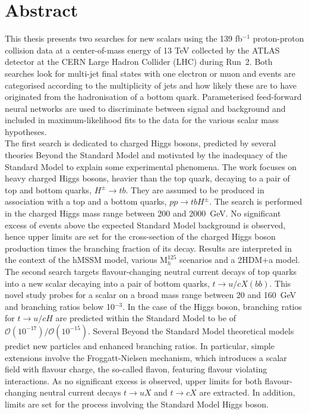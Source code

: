 \chapter*{Abstract}

This thesis presents two searches for new scalars using the 139 fb$^{-1}$ proton-proton collision data at a center-of-mass energy of 13 TeV collected by the ATLAS detector at the CERN Large Hadron Collider (LHC) during Run~2. Both searches look for multi-jet final states with one electron or muon and events are categorised according to the multiplicity of jets and how likely these are to have originated from the hadronisation of a bottom quark. Parameterised feed-forward neural networks are used to discriminate between signal and background and included in maximum-likelihood fits to the data for the various scalar mass hypotheses.\\

The first search is dedicated to charged Higgs bosons, predicted by several theories Beyond the Standard Model and motivated by the inadequacy of the Standard Model to explain some experimental phenomena. The work focuses on heavy charged Higgs bosons, heavier than the top quark, decaying to a pair of top and bottom quarks, $H^\pm\to tb$. They are assumed to be produced in association with a top and a bottom quarks, $pp\to tbH^\pm$. The search is performed in the charged Higgs mass range between 200 and 2000~GeV. No significant excess of events above the expected Standard Model background is observed, hence upper limits are set for the cross-section of the charged Higgs boson production times the branching fraction of its decay. Results are interpreted in the context of the hMSSM model, various $\text{M}_h^{125}$ scenarios and a 2HDM+a model.\\

The second search targets flavour-changing neutral current decays of top quarks into a new scalar decaying into a pair of bottom quarks, $t \to u/c X(bb)$. This novel study probes for a scalar on a broad mass range between 20 and 160~GeV and branching ratios below 10$^{-3}$. In the case of the Higgs boson, branching ratios for $t \to u/c H$ are predicted within the Standard Model to be of $\mathcal{O}(10^{-17})/\mathcal{O}(10^{-15})$. Several Beyond the Standard Model theoretical models predict new particles and enhanced branching ratios. In particular, simple extensions involve the Froggatt-Nielsen mechanism, which introduces a scalar field with flavour charge, the so-called flavon, featuring flavour violating interactions. As no significant excess is observed, upper limits for both flavour-changing neutral current decays $t\to uX$ and $t\to cX$ are extracted. In addition, limits are set for the process involving the Standard Model Higgs boson.
